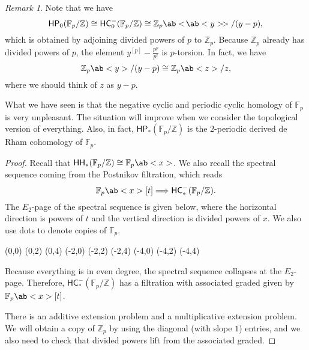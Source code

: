 \documentclass[10pt]{amsart}
\theoremstyle{definition}
\theoremstyle{remark}
\newtheorem{rmk}[thm]{Remark}
\theoremstyle{plain}
\theoremstyle{definition}
\theoremstyle{remark}
\newcommand{\Z}{\mathbb{Z}}
\newcommand{\F}{\mathbb{F}}
\newcommand{\ms}[1]{\mathsf{#1}}
\newcommand{\1}{\mathbf{1}}
\newcommand{\2}{\mathbf{2}}
\newcommand{\3}{\mathbf{3}}
\newcommand{\dps}[1]{\ab<\!\ab< #1 >\!>}
\newcommand{\HC}{\ms{HC}}
\newcommand{\HH}{\ms{HH}}
\newcommand{\HP}{\ms{HP}}
\begin{document}
\begin{rmk}
    Note that we have
    \[ \HP_0(\F_p/\Z) \cong \HC_0^-(\F_p/\Z) \cong \Z_p\dps{y}/(y-p), \]
    which is obtained by adjoining divided powers of $p$ to $\Z_p$. Because $\Z_p$ already has divided powers of $p$, the element $y^{[p]} - \frac{p^p}{p!}$ is $p$-torsion. In fact, we have
    \[ \Z_p \ab<y>/(y-p) \cong \Z_p \ab<z> / z, \]
    where we should think of $z$ as $y-p$.

    What we have seen is that the negative cyclic and periodic cyclic homology of $\F_p$ is very unpleasant. The situation will improve when we consider the topological version of everything. Also, in fact, $\HP_*(\F_p/\Z)$ is the $2$-periodic derived de Rham cohomology of $\F_p$.
\end{rmk}

\begin{proof}
    Recall that \(\HH_*(\F_p/\Z) \cong \F_p \ab<x>\). We also recall the spectral sequence coming from the Postnikov filtration, which reads
    \[ \F_p \ab<x>[t] \Longrightarrow \HC_*^-(\F_p / \Z). \]
    The $E_2$-page of the spectral sequence is given below, where the horizontal direction is powers of $t$ and the vertical direction is divided powers of $x$. We also use dots to denote copies of $\F_p$.
    \begin{center}
        \begin{sseqdata}[classes={draw=none}, name=omegas2, homological Serre
            grading, xscale=1, y axis gap = 2em, axes type = frame] 
            \class["\bullet"](0,0)
            \class["\bullet"](0,2) 
            \class["\bullet"](0,4) 
            \class["\bullet"](-2,0) 
            \class["\bullet"](-2,2) 
            \class["\bullet"](-2,4) 
            \class["\bullet"](-4,0) 
            \class["\bullet"](-4,2) 
            \class["\bullet"](-4,4)
        \end{sseqdata} 
        \printpage[name=omegas2, page=2] 
    \end{center} 
    Because everything is in even degree, the spectral sequence collapses at the $E_2$-page. Therefore, $\HC_*^-(\F_p/\Z)$ has a filtration with associated graded given by $\F_p\ab<x> [t]$.

    There is an additive extension problem and a multiplicative extension problem. We will obtain a copy of $\Z_p$ by using the diagonal (with slope $1$) entries, and we also need to check that divided powers lift from the associated graded.


\end{proof}
\end{document}

